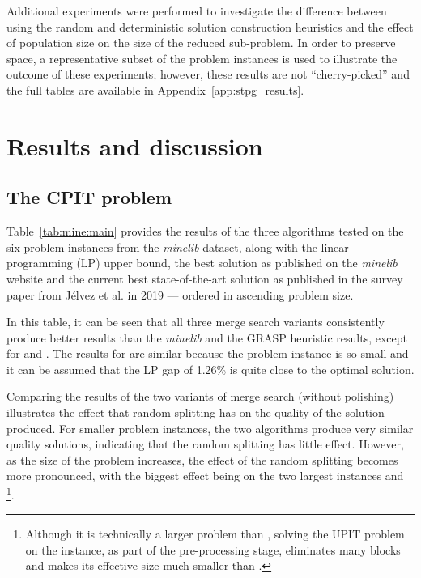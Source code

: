 \documentclass[journal]{IEEEtran}
\begin{document}
Additional experiments were performed to investigate the difference between using the random and deterministic solution construction heuristics and the effect of population size on the size of the reduced sub-problem. In order to preserve space, a representative subset of the problem instances is used to illustrate the outcome of these experiments; however, these results are not ``cherry-picked'' and the full tables are available in Appendix~\ref{app:stpg_results}. 

\section{Results and discussion}\label{sec:results}
\subsection{The CPIT problem}
Table~\ref{tab:mine:main} provides the results of the three algorithms tested on the six problem instances from the \emph{minelib} dataset, along with the linear programming (LP) upper bound, the best solution as published on the \emph{minelib} website and the current best state-of-the-art solution as published in the survey paper from J{\'e}lvez et al. in 2019 --- ordered in ascending problem size.

In this table, it can be seen that all three merge search variants consistently produce better results than the \emph{minelib} and the GRASP heuristic results, except for \newman{} and \zucklarge{}. The results for \newman{} are similar because the problem instance is so small and it can be assumed that the LP gap of 1.26\% is quite close to the optimal solution.

Comparing the results of the two variants of merge search (without polishing) illustrates the effect that random splitting has on the quality of the solution produced. For smaller problem instances, the two algorithms produce very similar quality solutions, indicating that the random splitting has little effect. However, as the size of the problem increases, the effect of the random splitting becomes more pronounced, with the biggest effect being on the two largest instances \zuckmed{} and \zucklarge{}\footnote{Although it is technically a larger problem than \zuckmed, solving the UPIT problem on the \marvin{} instance, as part of the pre-processing stage, eliminates many blocks and makes its effective size much smaller than \zuckmed.}. 
\end{document}

